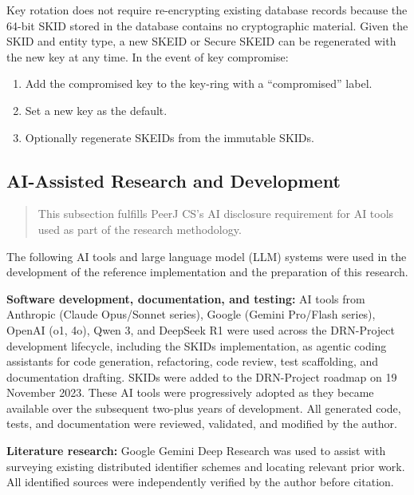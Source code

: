 \documentclass[fleqn,10pt]{wlpeerj}
\providecommand{\tightlist}{%
  \setlength{\itemsep}{0pt}\setlength{\parskip}{0pt}}
\begin{document}
Key rotation does not require re-encrypting existing database records
because the 64-bit SKID stored in the database contains no cryptographic
material. Given the SKID and entity type, a new SKEID or Secure SKEID
can be regenerated with the new key at any time. In the event of key
compromise:

\begin{enumerate}
\def\labelenumi{\arabic{enumi}.}
\tightlist
\item
  Add the compromised key to the key-ring with a ``compromised'' label.
\item
  Set a new key as the default.
\item
  Optionally regenerate SKEIDs from the immutable SKIDs.
\end{enumerate}

\subsection{AI-Assisted Research and
Development}\label{ai-assisted-research-and-development}

\begin{quote}
This subsection fulfills PeerJ CS's AI disclosure requirement for AI
tools used as part of the research methodology.
\end{quote}

The following AI tools and large language model (LLM) systems were used
in the development of the reference implementation and the preparation
of this research.

\textbf{Software development, documentation, and testing:} AI tools from
Anthropic (Claude Opus/Sonnet series), Google (Gemini Pro/Flash series),
OpenAI (o1, 4o), Qwen 3, and DeepSeek R1 were used across the
DRN-Project development lifecycle, including the SKIDs implementation,
as agentic coding assistants for code generation, refactoring, code
review, test scaffolding, and documentation drafting. SKIDs were added
to the DRN-Project roadmap on 19 November 2023. These AI tools were
progressively adopted as they became available over the subsequent
two-plus years of development. All generated code, tests, and
documentation were reviewed, validated, and modified by the author.

\textbf{Literature research:} Google Gemini Deep Research was used to
assist with surveying existing distributed identifier schemes and
locating relevant prior work. All identified sources were independently
verified by the author before citation.
\end{document}
